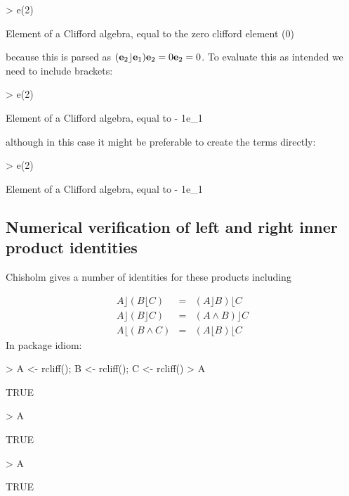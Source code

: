 \documentclass{birkjour}
\theoremstyle{definition}
\theoremstyle{remark}
\numberwithin{equation}{section}
\begin{document}
\begin{Schunk}
\begin{Sinput}
> e(2) %
\end{Sinput}
\begin{Soutput}
Element of a Clifford algebra, equal to
the zero clifford element (0)
\end{Soutput}
\end{Schunk}
%
because this is parsed as $({\bf e}_{2}\rfloor{\bf e}_{1}){\bf e}_{2}=0{\bf e}_{2}=0$.  To
evaluate this as intended we need to include brackets:

\begin{Schunk}
\begin{Sinput}
> e(2) %
\end{Sinput}
\begin{Soutput}
Element of a Clifford algebra, equal to
- 1e_1
\end{Soutput}
\end{Schunk}
%
although in this case it might be preferable to create the terms directly:

\begin{Schunk}
\begin{Sinput}
> e(2) %
\end{Sinput}
\begin{Soutput}
Element of a Clifford algebra, equal to
- 1e_1
\end{Soutput}
\end{Schunk}

\subsection{Numerical verification of left and right inner product identities}

Chisholm gives a number of identities for these products including

\begin{eqnarray}
  A\rfloor(B\lfloor C) &=& (A\rfloor B)\lfloor C\\
  A\rfloor(B\rfloor C) &=& (A\wedge B)\rfloor C\\
  A\lfloor(B\wedge  C) &=& (A\lfloor B)\lfloor C
\end{eqnarray}
%
In package idiom:

\begin{Schunk}
\begin{Sinput}
> A <- rcliff();  B <- rcliff();  C <- rcliff()
> A %
\end{Sinput}
\begin{Soutput}
[1] TRUE
\end{Soutput}
\begin{Sinput}
> A %
\end{Sinput}
\begin{Soutput}
[1] TRUE
\end{Soutput}
\begin{Sinput}
> A %
\end{Sinput}
\begin{Soutput}
[1] TRUE
\end{Soutput}
\end{Schunk}
\end{document}
